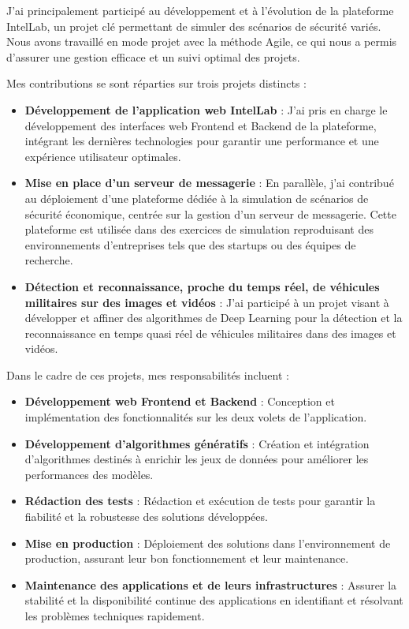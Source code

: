 J'ai principalement participé au développement et à l'évolution de la plateforme IntelLab, un projet clé permettant de simuler des scénarios de sécurité variés.
Nous avons travaillé en mode projet avec la méthode Agile, ce qui nous a permis d'assurer une gestion efficace et un suivi optimal des projets.

\noindent Mes contributions se sont réparties sur trois projets distincts :

\begin{itemize}\addtolength{\itemsep}{-0.35\baselineskip}%
  \item \textbf{Développement de l'application web IntelLab }: J'ai pris en charge le développement des interfaces web Frontend et Backend de la plateforme, intégrant les dernières technologies pour garantir une performance et une expérience utilisateur optimales.
  \item \textbf{Mise en place d'un serveur de messagerie} : En parallèle, j'ai contribué au déploiement d'une plateforme dédiée à la simulation de scénarios de sécurité économique, centrée sur la gestion d'un serveur de messagerie. Cette plateforme est utilisée dans des exercices de simulation reproduisant des environnements d'entreprises tels que des startups ou des équipes de recherche.
  \item \textbf{Détection et reconnaissance, proche du temps réel, de véhicules militaires sur des images et vidéos} : J'ai participé à un projet visant à développer et affiner des algorithmes de Deep Learning pour la détection et la reconnaissance en temps quasi réel de véhicules militaires dans des images et vidéos.
\end{itemize}

\noindent Dans le cadre de ces projets, mes responsabilités incluent :

\begin{itemize}\addtolength{\itemsep}{-0.35\baselineskip}%
  \item \textbf{Développement web Frontend et Backend} : Conception et implémentation des fonctionnalités sur les deux volets de l'application.
  \item \textbf{Développement d'algorithmes génératifs} : Création et intégration d'algorithmes destinés à enrichir les jeux de données pour améliorer les performances des modèles.
  \item \textbf{Rédaction des tests} : Rédaction et exécution de tests pour garantir la fiabilité et la robustesse des solutions développées.
  \item \textbf{Mise en production} : Déploiement des solutions dans l'environnement de production, assurant leur bon fonctionnement et leur maintenance.
  \item \textbf{Maintenance des applications et de leurs infrastructures} : Assurer la stabilité et la disponibilité continue des applications en identifiant et résolvant les problèmes techniques rapidement.
\end{itemize}


